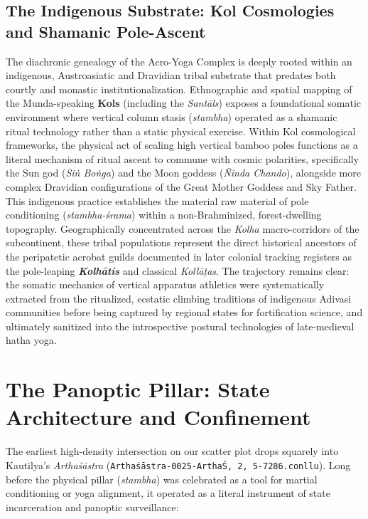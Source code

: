 \documentclass[11pt,letterpaper]{article}
\begin{document}
\subsection{The Indigenous Substrate: Kol Cosmologies and Shamanic Pole-Ascent}
The diachronic genealogy of the Acro-Yoga Complex is deeply rooted within an indigenous, Austroasiatic and Dravidian tribal substrate that predates both courtly and monastic institutionalization. Ethnographic and spatial mapping of the Munda-speaking \textbf{Kols} (including the \textit{Santāls}) exposes a foundational somatic environment where vertical column stasis (\textit{stambha}) operated as a shamanic ritual technology rather than a static physical exercise. Within Kol cosmological frameworks, the physical act of scaling high vertical bamboo poles functions as a literal mechanism of ritual ascent to commune with cosmic polarities, specifically the Sun god (\textit{Siṅ Boṅga}) and the Moon goddess (\textit{Ñinda Chando}), alongside more complex Dravidian configurations of the Great Mother Goddess and Sky Father. This indigenous practice establishes the material raw material of pole conditioning (\textit{stambha-śrama}) within a non-Brahminized, forest-dwelling topography. Geographically concentrated across the \textit{Kolha} macro-corridors of the subcontinent, these tribal populations represent the direct historical ancestors of the peripatetic acrobat guilds documented in later colonial tracking registers as the pole-leaping \textbf{\textit{Kolhātis}} and classical \textit{Kollāṭas}. The trajectory remains clear: the somatic mechanics of vertical apparatus athletics were systematically extracted from the ritualized, ecstatic climbing traditions of indigenous Adivasi communities before being captured by regional states for fortification science, and ultimately sanitized into the introspective postural technologies of late-medieval hatha yoga.



\section{The Panoptic Pillar: State Architecture and Confinement}
The earliest high-density intersection on our scatter plot drops squarely into Kautilya's \textit{Arthaśāstra} (\texttt{Arthaśāstra-0025-ArthaŚ, 2, 5-7286.conllu}). Long before the physical pillar (\textit{stambha}) was celebrated as a tool for martial conditioning or yoga alignment, it operated as a literal instrument of state incarceration and panoptic surveillance:
\end{document}

